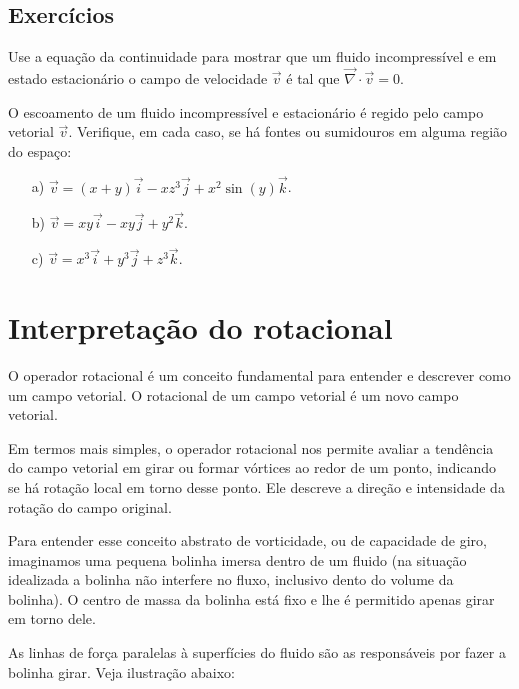 \subsection*{Exercícios}
\begin{exer}
Use a equação da continuidade para mostrar que um fluido incompressível e em estado estacionário o campo de velocidade $\vec{v}$ é tal que $\vec{\nabla}\cdot \vec{v}=0$.
\end{exer}
\begin{exer}
 O escoamento de um fluido incompressível e estacionário é regido pelo campo vetorial $\vec{v}$. Verifique, em cada caso, se há fontes ou sumidouros em alguma região do espaço:
 \begin{itemize}
  \item[a)] $\vec{v}=(x+y)\vec{i}-xz^3\vec{j}+x^2\sin(y)\vec{k}$.
  \item[b)] $\vec{v}=xy\vec{i}-xy\vec{j}+y^2\vec{k}$.
  \item[c)] $\vec{v}=x^3\vec{i}+y^3\vec{j}+z^3\vec{k}$.

  \end{itemize}

\end{exer}



\section{Interpretação do rotacional}
O operador rotacional é um conceito fundamental para entender e descrever como um campo vetorial. O rotacional de um campo vetorial é um novo campo vetorial.

Em termos mais simples, o operador rotacional nos permite avaliar a tendência do campo vetorial em girar ou formar vórtices ao redor de um ponto, indicando se há rotação local em torno desse ponto. Ele descreve a direção e intensidade da rotação do campo original. 

Para entender esse conceito abstrato de vorticidade, ou de capacidade de giro, imaginamos uma pequena bolinha imersa dentro de um fluido (na situação idealizada a bolinha não interfere no fluxo, inclusivo  dento do volume da bolinha). O centro de massa da bolinha está fixo e lhe é permitido apenas girar em torno dele. 

As linhas de força paralelas à superfícies do fluido são as responsáveis por fazer a bolinha girar. Veja ilustração abaixo:

